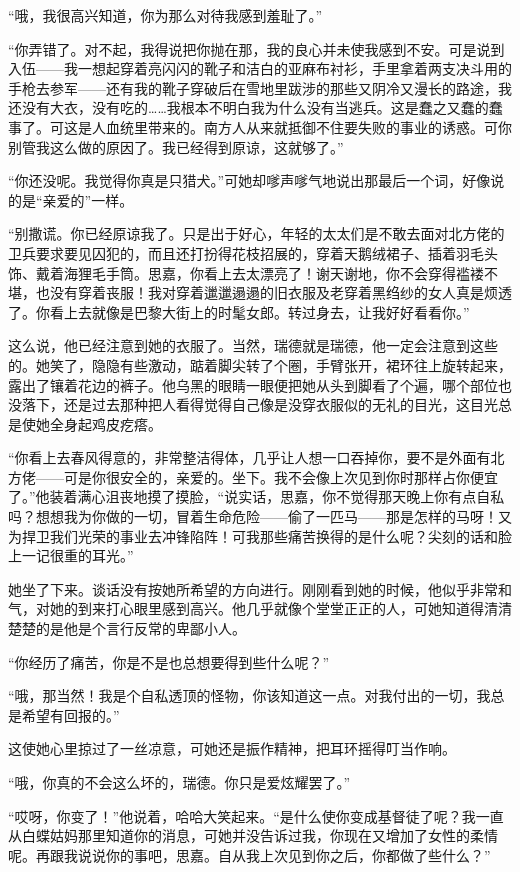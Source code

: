 \par “哦，我很高兴知道，你为那么对待我感到羞耻了。”
\par “你弄错了。对不起，我得说把你抛在那，我的良心并未使我感到不安。可是说到入伍——我一想起穿着亮闪闪的靴子和洁白的亚麻布衬衫，手里拿着两支决斗用的手枪去参军——还有我的靴子穿破后在雪地里跋涉的那些又阴冷又漫长的路途，我还没有大衣，没有吃的……我根本不明白我为什么没有当逃兵。这是蠢之又蠢的蠢事了。可这是人血统里带来的。南方人从来就抵御不住要失败的事业的诱惑。可你别管我这么做的原因了。我已经得到原谅，这就够了。”
\par “你还没呢。我觉得你真是只猎犬。”可她却嗲声嗲气地说出那最后一个词，好像说的是“亲爱的”一样。
\par “别撒谎。你已经原谅我了。只是出于好心，年轻的太太们是不敢去面对北方佬的卫兵要求要见囚犯的，而且还打扮得花枝招展的，穿着天鹅绒裙子、插着羽毛头饰、戴着海狸毛手筒。思嘉，你看上去太漂亮了！谢天谢地，你不会穿得褴褛不堪，也没有穿着丧服！我对穿着邋邋遢遢的旧衣服及老穿着黑绉纱的女人真是烦透了。你看上去就像是巴黎大街上的时髦女郎。转过身去，让我好好看看你。”
\par 这么说，他已经注意到她的衣服了。当然，瑞德就是瑞德，他一定会注意到这些的。她笑了，隐隐有些激动，踮着脚尖转了个圈，手臂张开，裙环往上旋转起来，露出了镶着花边的裤子。他乌黑的眼睛一眼便把她从头到脚看了个遍，哪个部位也没落下，还是过去那种把人看得觉得自己像是没穿衣服似的无礼的目光，这目光总是使她全身起鸡皮疙瘩。
\par “你看上去春风得意的，非常整洁得体，几乎让人想一口吞掉你，要不是外面有北方佬——可是你很安全的，亲爱的。坐下。我不会像上次见到你时那样占你便宜了。”他装着满心沮丧地摸了摸脸，“说实话，思嘉，你不觉得那天晚上你有点自私吗？想想我为你做的一切，冒着生命危险——偷了一匹马——那是怎样的马呀！又为捍卫我们光荣的事业去冲锋陷阵！可我那些痛苦换得的是什么呢？尖刻的话和脸上一记很重的耳光。”
\par 她坐了下来。谈话没有按她所希望的方向进行。刚刚看到她的时候，他似乎非常和气，对她的到来打心眼里感到高兴。他几乎就像个堂堂正正的人，可她知道得清清楚楚的是他是个言行反常的卑鄙小人。
\par “你经历了痛苦，你是不是也总想要得到些什么呢？”
\par “哦，那当然！我是个自私透顶的怪物，你该知道这一点。对我付出的一切，我总是希望有回报的。”
\par 这使她心里掠过了一丝凉意，可她还是振作精神，把耳环摇得叮当作响。
\par “哦，你真的不会这么坏的，瑞德。你只是爱炫耀罢了。”
\par “哎呀，你变了！”他说着，哈哈大笑起来。“是什么使你变成基督徒了呢？我一直从白蝶姑妈那里知道你的消息，可她并没告诉过我，你现在又增加了女性的柔情呢。再跟我说说你的事吧，思嘉。自从我上次见到你之后，你都做了些什么？”

